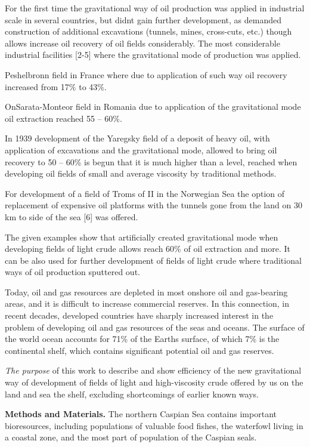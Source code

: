 For the first time the gravitational way of oil production was applied
in industrial scale in several countries, but didn\textquotesingle t
gain further development, as demanded construction of additional
excavations (tunnels, mines, cross-cuts, etc.) though allows increase
oil recovery of oil fields considerably. The most considerable
industrial facilities {[}2-5{]} where the gravitational mode of
production was applied.

Peshelbronn field in France where due to application of such way oil
recovery increased from 17\% to 43\%.

OnSarata-Monteor field in Romania due to application of the
gravitational mode oil extraction reached 55 -- 60\%.

In 1939 development of the Yaregsky field of a deposit of heavy oil,
with application of excavations and the gravitational mode, allowed to
bring oil recovery to 50 -- 60\% is begun that it is much higher than a
level, reached when developing oil fields of small and average viscosity
by traditional methods.

For development of a field of Troms of II in the Norwegian Sea the
option of replacement of expensive oil platforms with the tunnels gone
from the land on 30 km to side of the sea {[}6{]} was offered.

The given examples show that artificially created gravitational mode
when developing fields of light crude allows reach 60\% of oil
extraction and more. It can be also used for further development of
fields of light crude where traditional ways of oil production sputtered
out.

Today, oil and gas resources are depleted in most onshore oil and
gas-bearing areas, and it is difficult to increase commercial reserves.
In this connection, in recent decades, developed countries have sharply
increased interest in the problem of developing oil and gas resources of
the seas and oceans. The surface of the world ocean accounts for 71\% of
the Earth\textquotesingle s surface, of which 7\% is the continental
shelf, which contains significant potential oil and gas reserves.

\emph{The purpose} of this work to describe and show efficiency of the
new gravitational way of development of fields of light and
high-viscosity crude offered by us on the land and sea the shelf,
excluding shortcomings of earlier known ways.

{\bfseries Methods and Materials.} The northern Caspian Sea contains
important bioresources, including populations of valuable food fishes,
the waterfowl living in a coastal zone, and the most part of population
of the Caspian seals.

